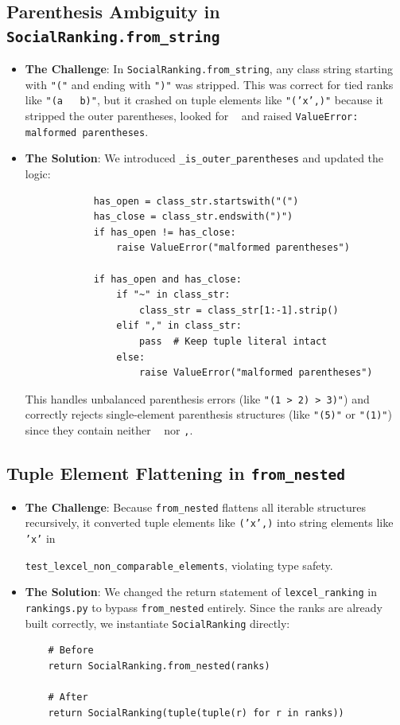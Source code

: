 \documentclass[11pt]{article}
\newcommand{\pathitem}[1]{\texttt{#1}}
\begin{document}
\subsection{Parenthesis Ambiguity in \pathitem{SocialRanking.from\_string}}
\begin{itemize}
  \item \textbf{The Challenge}: In \pathitem{SocialRanking.from\_string}, any class string starting with \texttt{"("} and ending with \texttt{")"} was stripped. This was correct for tied ranks like \texttt{"(a \string~ b)"}, but it crashed on tuple elements like \texttt{"('x',)"} because it stripped the outer parentheses, looked for \texttt{\string~} and raised \texttt{ValueError: malformed parentheses}.
  \item \textbf{The Solution}: We introduced \pathitem{\_is\_outer\_parentheses} and updated the logic:
  \begin{verbatim}
            has_open = class_str.startswith("(")
            has_close = class_str.endswith(")")
            if has_open != has_close:
                raise ValueError("malformed parentheses")

            if has_open and has_close:
                if "~" in class_str:
                    class_str = class_str[1:-1].strip()
                elif "," in class_str:
                    pass  # Keep tuple literal intact
                else:
                    raise ValueError("malformed parentheses")
  \end{verbatim}
  This handles unbalanced parenthesis errors (like \texttt{"(1 > 2) > 3)"}) and correctly rejects single-element parenthesis structures (like \texttt{"(5)"} or \texttt{"(1)"}) since they contain neither \texttt{\string~} nor \texttt{,}.
\end{itemize}

\subsection{Tuple Element Flattening in \pathitem{from\_nested}}
\begin{itemize}
  \item \textbf{The Challenge}: Because \pathitem{from\_nested} flattens all iterable structures recursively, it converted tuple elements like \texttt{('x',)} into string elements like \texttt{'x'} in 
  
  \pathitem{test\_lexcel\_non\_comparable\_elements}, violating type safety.
  \item \textbf{The Solution}: We changed the return statement of \pathitem{lexcel\_ranking} in \pathitem{rankings.py} to bypass \pathitem{from\_nested} entirely. Since the ranks are already built correctly, we instantiate \pathitem{SocialRanking} directly:
  \begin{verbatim}
    # Before
    return SocialRanking.from_nested(ranks)

    # After
    return SocialRanking(tuple(tuple(r) for r in ranks))
  \end{verbatim}
\end{itemize}
\end{document}
